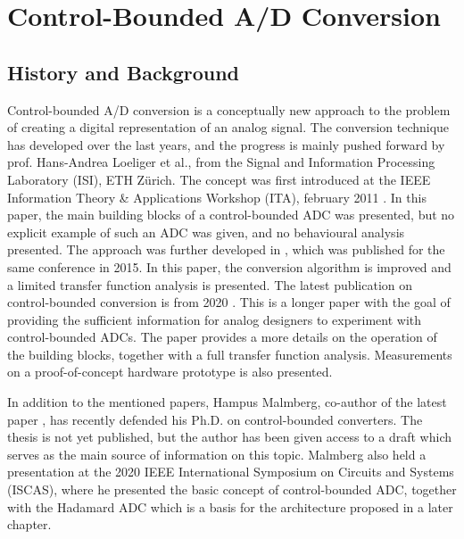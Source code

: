 
\chapter{Control-Bounded A/D Conversion}
\label{sec:cbadc}
\section{History and Background}
Control-bounded A/D conversion is a conceptually new approach to the problem of creating a digital representation of an analog signal. The conversion technique has developed over the last years, and the progress is mainly pushed forward by prof. Hans-Andrea Loeliger et al., from the Signal and Information Processing Laboratory (ISI), ETH Zürich. The concept was first introduced at the IEEE Information Theory \& Applications Workshop (ITA), february 2011 \cite{cbc_2011_loeliger}. In this paper, the main building blocks of a control-bounded ADC was presented, but no explicit example of such an ADC was given, and no behavioural analysis presented. The approach was further developed in \cite{cbc_2015_loeliger}, which was published for the same conference in 2015. In this paper, the conversion algorithm is improved and a limited transfer function analysis is presented. The latest publication on control-bounded conversion is from 2020 \cite{cbc_2020_loeliger}. This is a longer paper with the goal of providing the sufficient information for analog designers to experiment with control-bounded ADCs. The paper provides a more details on the operation of the building blocks, together with a full transfer function analysis. Measurements on a proof-of-concept hardware prototype is also presented.

In addition to the mentioned papers, Hampus Malmberg, co-author of the latest paper \cite{cbc_2020_loeliger}, has recently defended his Ph.D. on control-bounded converters. The thesis\cite{malmberg_thesis} is not yet published, but the author has been given access to a draft which serves as the main source of information on this topic. Malmberg also held a presentation at the 2020 IEEE International Symposium on Circuits and Systems (ISCAS)\cite{malmberg_talk}, where he presented the basic concept of control-bounded ADC, together with the Hadamard ADC which is a basis for the architecture proposed in a later chapter.

